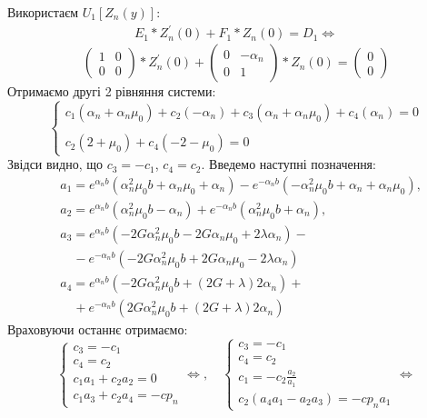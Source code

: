 \documentclass[a4paper,14pt]{extarticle}
\numberwithin{equation}{section}
\begin{document}
Використаєм $U_1\left[ Z_n(y) \right]$:
\begin{eqnarray*}
    E_1 * Z_n^{'}(0) + F_1 * Z_n(0) = D_1 \Leftrightarrow
\end{eqnarray*}
\begin{equation*}
    \begin{pmatrix}
        1 & 0 \\
        0 & 0
    \end{pmatrix} * Z_n^{'}(0) + \begin{pmatrix}
        0 & -\alpha_n \\
        0 & 1
    \end{pmatrix} * Z_n(0) = \begin{pmatrix}
        0 \\
        0
    \end{pmatrix}
\end{equation*}
Отримаємо другі 2 рівняння системи:
\begin{equation*}
    \begin{cases}
        c_1 (\alpha_n + \alpha_n \mu_0) + c_2 (-\alpha_n) + c_3 (\alpha_n + \alpha_n \mu_0) + c_4 (\alpha_n) = 0 \\
        \\
        c_2 (2 + \mu_0) + c_4 (-2 - \mu_0) = 0
    \end{cases}
\end{equation*}
Звідси видно, що $c_3 = -c_1$, $c_4 = c_2$.
Введемо наступні позначення:
\begin{align*}
    &a_1 = e^{\alpha_n b} (\alpha_n^2 \mu_0 b + \alpha_n \mu_0 + \alpha_n) - e^{-\alpha_n b} (-\alpha_n^2 \mu_0 b + \alpha_n + \alpha_n \mu_0), \\
    &a_2 = e^{\alpha_n b} (\alpha_n^2 \mu_0 b - \alpha_n) + e^{-\alpha_n b} (\alpha_n^2 \mu_0 b + \alpha_n), \\
    &a_3 = e^{\alpha_n b} (-2 G \alpha_n^2 \mu_0 b - 2 G \alpha_n \mu_0 + 2 \lambda \alpha_n) - \\
    &\quad - e^{-\alpha_n b} (-2 G \alpha_n^2 \mu_0 b + 2G \alpha_n \mu_0 - 2\lambda \alpha_n) \\
    &a_4 = e^{\alpha_n b} (-2G \alpha_n^2 \mu_0 b + (2G + \lambda) 2 \alpha_n) + \\
    &\quad + e^{-\alpha_n b} (2G \alpha_n^2 \mu_0 b + (2G + \lambda) 2 \alpha_n)
\end{align*}
Враховуючи останнє отримаємо:
\begin{equation*}
    \begin{cases}
        c_3 = -c_1 \\
        c_4 = c_2 \\
        c_1 a_1 + c_2 a_2 = 0 \\
        c_1 a_3 + c_2 a_4 = -c p_n
    \end{cases} \Leftrightarrow, \quad 
    \begin{cases}
        c_3 = -c_1 \\
        c_4 = c_2 \\
        c_1 = - c_2 \frac{a_2}{a_1} \\
        c_2(a_4 a_1 - a_2 a_3) = -c p_n a_1
    \end{cases} \Leftrightarrow
\end{equation*}
\end{document}
